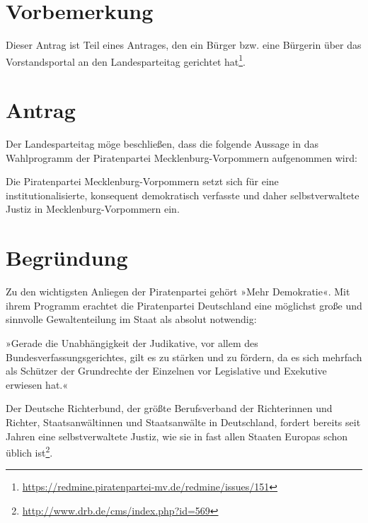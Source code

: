 \section{Vorbemerkung}

Dieser Antrag ist Teil eines Antrages, den ein Bürger bzw. eine Bürgerin über das Vorstandsportal an den Landesparteitag gerichtet hat\footnote{\url{https://redmine.piratenpartei-mv.de/redmine/issues/151}}.

\section{Antrag}

Der Landesparteitag möge beschließen, dass die folgende Aussage in das Wahlprogramm der Piratenpartei Mecklenburg-Vorpommern aufgenommen wird:

Die Piratenpartei Mecklenburg-Vorpommern setzt sich für eine institutionalisierte, konsequent demokratisch verfasste und daher selbstverwaltete Justiz in Mecklenburg-Vorpommern ein.

\section{Begründung}

Zu den wichtigsten Anliegen der Piratenpartei gehört »Mehr Demokratie«. Mit ihrem Programm erachtet die Piratenpartei Deutschland eine möglichst große und sinnvolle Gewaltenteilung im Staat als absolut notwendig:

»Gerade die Unabhängigkeit der Judikative, vor allem des Bundesverfassungsgerichtes, gilt es zu stärken und zu fördern, da es sich mehrfach als Schützer der Grundrechte der Einzelnen vor Legislative und Exekutive erwiesen hat.«

Der Deutsche Richterbund, der größte Berufsverband der Richterinnen und Richter, Staatsanwältinnen und Staatsanwälte in Deutschland, fordert bereits seit Jahren eine selbstverwaltete Justiz, wie sie in fast allen Staaten Europas schon üblich ist\footnote{\url{http://www.drb.de/cms/index.php?id=569}}.
